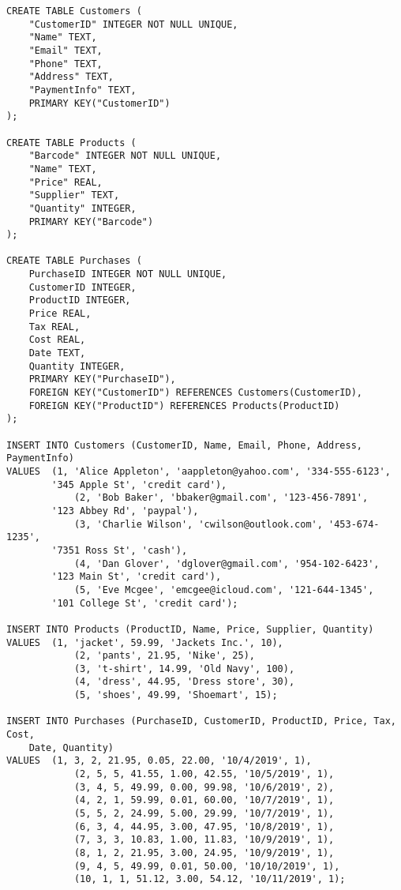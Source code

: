 \documentclass[notitlepage,11pt]{report}
\begin{document}
\Suppressnumber
\begin{lstlisting}
CREATE TABLE Customers (
	"CustomerID" INTEGER NOT NULL UNIQUE,
	"Name" TEXT,
	"Email" TEXT,
	"Phone" TEXT,
	"Address" TEXT,
	"PaymentInfo" TEXT,
	PRIMARY KEY("CustomerID")
);

CREATE TABLE Products (
	"Barcode" INTEGER NOT NULL UNIQUE,
	"Name" TEXT,
	"Price" REAL,
	"Supplier" TEXT,
	"Quantity" INTEGER,
	PRIMARY KEY("Barcode")
);

CREATE TABLE Purchases (
	PurchaseID INTEGER NOT NULL UNIQUE,
	CustomerID INTEGER,
	ProductID INTEGER,
	Price REAL,
	Tax REAL,
	Cost REAL,
	Date TEXT,
	Quantity INTEGER,
	PRIMARY KEY("PurchaseID"),
	FOREIGN KEY("CustomerID") REFERENCES Customers(CustomerID),
	FOREIGN KEY("ProductID") REFERENCES Products(ProductID)
);

INSERT INTO Customers (CustomerID, Name, Email, Phone, Address, PaymentInfo)
VALUES	(1, 'Alice Appleton', 'aappleton@yahoo.com', '334-555-6123', 
		'345 Apple St', 'credit card'),
			(2, 'Bob Baker', 'bbaker@gmail.com', '123-456-7891', 
		'123 Abbey Rd', 'paypal'),
			(3, 'Charlie Wilson', 'cwilson@outlook.com', '453-674-1235', 
		'7351 Ross St', 'cash'),
			(4, 'Dan Glover', 'dglover@gmail.com', '954-102-6423', 
		'123 Main St', 'credit card'),
			(5, 'Eve Mcgee', 'emcgee@icloud.com', '121-644-1345', 
		'101 College St', 'credit card');

INSERT INTO Products (ProductID, Name, Price, Supplier, Quantity)
VALUES	(1, 'jacket', 59.99, 'Jackets Inc.', 10),
			(2, 'pants', 21.95, 'Nike', 25),
			(3, 't-shirt', 14.99, 'Old Navy', 100),
			(4, 'dress', 44.95, 'Dress store', 30),
			(5, 'shoes', 49.99, 'Shoemart', 15);

INSERT INTO Purchases (PurchaseID, CustomerID, ProductID, Price, Tax, Cost, 
	Date, Quantity)
VALUES	(1, 3, 2, 21.95, 0.05, 22.00, '10/4/2019', 1),
			(2, 5, 5, 41.55, 1.00, 42.55, '10/5/2019', 1),
			(3, 4, 5, 49.99, 0.00, 99.98, '10/6/2019', 2),
			(4, 2, 1, 59.99, 0.01, 60.00, '10/7/2019', 1),
			(5, 5, 2, 24.99, 5.00, 29.99, '10/7/2019', 1),
			(6, 3, 4, 44.95, 3.00, 47.95, '10/8/2019', 1),
			(7, 3, 3, 10.83, 1.00, 11.83, '10/9/2019', 1),
			(8, 1, 2, 21.95, 3.00, 24.95, '10/9/2019', 1),
			(9, 4, 5, 49.99, 0.01, 50.00, '10/10/2019', 1),
			(10, 1, 1, 51.12, 3.00, 54.12, '10/11/2019', 1);
\end{lstlisting}
\end{document}
